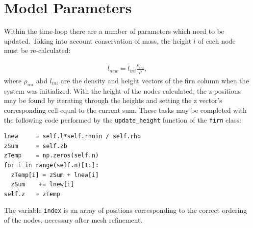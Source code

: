 \documentclass{article}%
\begin{document}
\section{Model Parameters}

Within the time-loop there are a number of parameters which need to be updated.  Taking into account conservation of mass, the height $l$ of each node must be re-calculated:\par
\begin{align*}
  l_{new} = l_{ini} \frac{\rho_{ini}}{\rho},
\end{align*}
where $\rho_{ini}$ abd $l_{ini}$ are the density and height vectors of the firn column when the system was initialized.  With the height of the nodes calculated, the z-positions may be found by iterating through the heights and setting the z vector's corresponding cell equal to the current sum.  These tasks may be completed with the following code performed by the \texttt{update\_height} function of the \texttt{firn} class:\par
\footnotesize
\begin{verbatim}
lnew     = self.l*self.rhoin / self.rho
zSum     = self.zb
zTemp    = np.zeros(self.n)
for i in range(self.n)[1:]:
  zTemp[i] = zSum + lnew[i]
  zSum    += lnew[i]
self.z   = zTemp
\end{verbatim}
\normalsize
The variable \texttt{index} is an array of positions corresponding to the correct ordering of the nodes, necessary after mesh refinement.  
\end{document}

